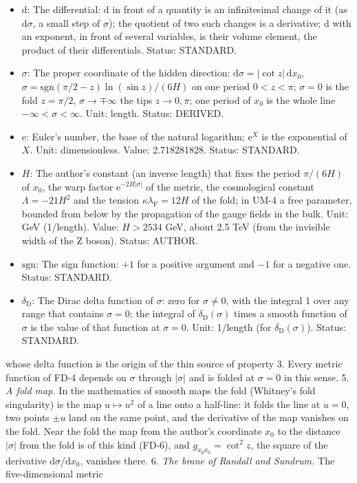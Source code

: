 \documentclass[
  10pt,
]{article}
\providecommand{\tightlist}{%
  \setlength{\itemsep}{0pt}\setlength{\parskip}{0pt}}
\begin{document}
\begin{itemize}
\tightlist
\item
  \(\mathrm{d}\): The differential: \(\mathrm{d}\) in front of a
  quantity is an infinitesimal change of it (as \(\mathrm{d}\sigma\), a
  small step of \(\sigma\)); the quotient of two such changes is a
  derivative; \(\mathrm{d}\) with an exponent, in front of several
  variables, is their volume element, the product of their
  differentials. Status: STANDARD.
\item
  \(\sigma\): The proper coordinate of the hidden direction:
  \(\mathrm{d}\sigma = \lvert\cot z\rvert\,\mathrm{d}x_0\),
  \(\sigma = \mathrm{sgn}(\pi/2 - z)\ln(\sin z)/(6H)\) on one period
  \(0 < z < \pi\); \(\sigma = 0\) is the fold \(z = \pi/2\),
  \(\sigma \to \mp\infty\) the tips \(z \to 0, \pi\); one period of
  \(x_0\) is the whole line \(-\infty < \sigma < \infty\). Unit: length.
  Status: DERIVED.
\item
  \(\mathrm{e}\): Euler's number, the base of the natural logarithm;
  \(\mathrm{e}^{X}\) is the exponential of \(X\). Unit: dimensionless.
  Value: 2.718281828. Status: STANDARD.
\item
  \(H\): The author's constant (an inverse length) that fixes the period
  \(\pi/(6H)\) of \(x_0\), the warp factor
  \(\mathrm{e}^{-2H\lvert\sigma\rvert}\) of the metric, the cosmological
  constant \(\Lambda = -21H^2\) and the tension
  \(\kappa\lambda_{\mathrm{F}} = 12H\) of the fold; in UM-4 a free
  parameter, bounded from below by the propagation of the gauge fields
  in the bulk. Unit: GeV (1/length). Value: \(H > 2534\) GeV, about 2.5
  TeV (from the invisible width of the Z boson). Status: AUTHOR.
\item
  \(\mathrm{sgn}\): The sign function: \(+1\) for a positive argument
  and \(-1\) for a negative one. Status: STANDARD.
\item
  \(\delta_{\mathrm{D}}\): The Dirac delta function of \(\sigma\): zero
  for \(\sigma \ne 0\), with the integral 1 over any range that contains
  \(\sigma = 0\); the integral of \(\delta_{\mathrm{D}}(\sigma)\) times
  a smooth function of \(\sigma\) is the value of that function at
  \(\sigma = 0\). Unit: 1/length (for \(\delta_{\mathrm{D}}(\sigma)\)).
  Status: STANDARD.
\end{itemize}

whose delta function is the origin of the thin source of property 3.
Every metric function of FD-4 depends on \(\sigma\) through
\(\lvert\sigma\rvert\) and is folded at \(\sigma = 0\) in this sense. 5.
\emph{A fold map.} In the mathematics of smooth maps the fold (Whitney's
fold singularity) is the map \(u \mapsto u^2\) of a line onto a
half-line: it folds the line at \(u = 0\), two points \(\pm u\) land on
the same point, and the derivative of the map vanishes on the fold. Near
the fold the map from the author's coordinate \(x_0\) to the distance
\(\lvert\sigma\rvert\) from the fold is of this kind (FD-6), and
\(g_{x_0x_0} = \cot^2z\), the square of the derivative
\(\mathrm{d}\sigma/\mathrm{d}x_0\), vanishes there. 6. \emph{The brane
of Randall and Sundrum.} The five-dimensional metric
\end{document}
